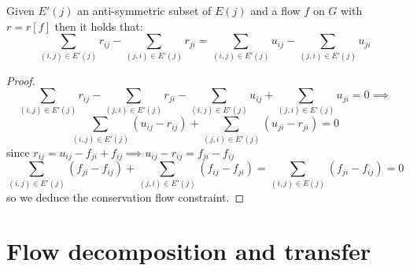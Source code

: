 \begin{lemma}

    Given $E'(j)$ an anti-symmetric subset of $E(j)$ and a flow $f$ on $G$ with $r = r[f]$ then it holds that:
    \[\sum_{(i,j)\in E'(j)}r_{ij} - \sum_{(j,i)\in E'(j)}r_{ji} = \sum_{(i,j)\in E'(j)}u_{ij} - \sum_{(j,i)\in E'(j)}u_{ji} \]
\end{lemma}
\begin{proof}
    \[\sum_{(i,j)\in E'(j)}r_{ij} - \sum_{(j,i)\in E'(j)}r_{ji} -\sum_{(i,j)\in E'(j)}u_{ij} + \sum_{(j,i)\in E'(j)}u_{ji}= 0 \implies\]
    \[\sum_{(i,j)\in E'(j)}(u_{ij}-r_{ij}) + \sum_{(j,i)\in E'(j)}(u_{ji}-r_{ji}) = 0 \]
    since $r_{ij} = u_{ij} - f_{ji} + f_{ij} \implies u_{ij} -r_{ij} = f_{ji}- f_{ij}$ 
    \[\sum_{(i,j)\in E'(j)}(f_{ji}-f_{ij}) + \sum_{(j,i)\in E'(j)}(f_{ij}-f_{ji}) = \sum_{(i,j)\in E(j)}(f_{ji}-f_{ij}) = 0\]
    so we deduce the conservation flow constraint. 

\end{proof}
\section{Flow decomposition and transfer}

